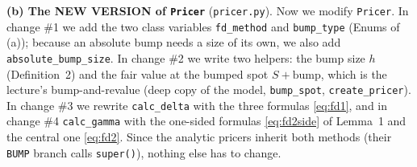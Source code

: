 \documentclass[11pt,a4paper]{article}
\newcommand{\step}[1]{\par\smallskip\noindent\textbf{#1}\enspace\ignorespaces}
\begin{document}
\step{(b) The NEW VERSION of \texttt{Pricer}} (\texttt{pricer.py}). Now we modify \texttt{Pricer}. In change \#1 we add the two class variables \texttt{fd\_method} and \texttt{bump\_type} (Enums of (a)); because an absolute bump needs a size of its own, we also add \texttt{absolute\_bump\_size}. In change \#2 we write two helpers: the bump size $h$ (Definition~2) and the fair value at the bumped spot $S+\text{bump}$, which is the lecture's bump-and-revalue (deep copy of the model, \texttt{bump\_spot}, \texttt{create\_pricer}). In change \#3 we rewrite \texttt{calc\_delta} with the three formulas \eqref{eq:fd1}, and in change \#4 \texttt{calc\_gamma} with the one-sided formulas \eqref{eq:fd2side} of Lemma~1 and the central one \eqref{eq:fd2}. Since the analytic pricers inherit both methods (their \texttt{BUMP} branch calls \texttt{super()}), nothing else has to change.
\end{document}
